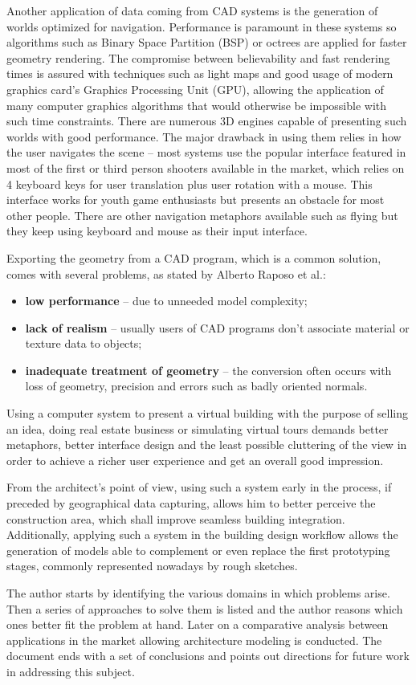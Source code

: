 Another application of data coming from CAD systems is the generation of worlds optimized for navigation.
Performance is paramount in these systems so algorithms such as Binary Space Partition (BSP) or octrees are applied
for faster geometry rendering. The compromise between believability and fast rendering times
is assured with techniques such as light maps and good usage of modern graphics card's Graphics Processing Unit (GPU),
allowing the application of many computer graphics algorithms that would otherwise be impossible with such time constraints.
There are numerous 3D engines capable of presenting such worlds with good performance.
The major drawback in using them relies in how the user navigates the scene --
most systems use the popular interface featured in most of the first or third person shooters available in the market,
which relies on 4 keyboard keys for user translation plus user rotation with a mouse.
This interface works for youth game enthusiasts but presents an obstacle for most other people.
There are other navigation metaphors available such as flying but they keep using keyboard and mouse as their input interface.

Exporting the geometry from a CAD program, which is a common solution, comes with several problems,
as stated by Alberto Raposo et al.\cite{CADVR06}:
\begin{itemize}
	\item[] \textbf{low performance} -- due to unneeded model complexity;
	\item[] \textbf{lack of realism} -- usually users of CAD programs don't associate material
	or texture data to objects;
	\item[] \textbf{inadequate treatment of geometry} -- the conversion often occurs with loss of
	geometry, precision and errors such as badly oriented normals.
\end{itemize}

Using a computer system to present a virtual building with the purpose of selling an idea, doing real estate business
or simulating virtual tours demands better metaphors, better interface design and the least possible cluttering
of the view in order to achieve a richer user experience and get an overall good impression.

From the architect's point of view, using such a system early in the process, if preceded by geographical data capturing,
allows him to better perceive the construction area, which shall improve seamless building integration.
Additionally, applying such a system in the building design workflow allows the generation of models able to
complement or even replace the first prototyping stages, commonly represented nowadays by rough sketches.

The author starts by identifying the various domains in which problems arise.
Then a series of approaches to solve them is listed and the author reasons which ones better fit the problem at hand.
Later on a comparative analysis between applications in the market allowing architecture modeling is conducted.
The document ends with a set of conclusions and points out directions for future work in addressing this subject.

